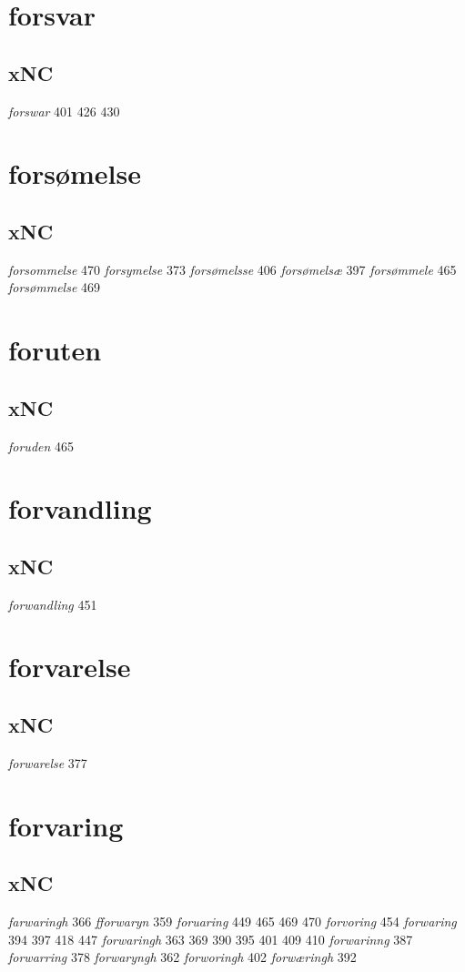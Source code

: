 \documentclass[a4paper,twocolumn]{article}
\begin{document}
\section{forsvar}
\label{sec:org2040b30}
\subsection{xNC}
\label{sec:orge80c26a}
\emph{forswar} 401 426 430 
\section{forsømelse}
\label{sec:org3353c8f}
\subsection{xNC}
\label{sec:org1ab0f16}
\emph{forsommelse} 470 \emph{forsymelse} 373 \emph{forsømelsse} 406 \emph{forsømelsæ} 397 \emph{forsømmele} 465 \emph{forsømmelse} 469 
\section{foruten}
\label{sec:org7389f62}
\subsection{xNC}
\label{sec:org413c5e6}
\emph{foruden} 465 
\section{forvandling}
\label{sec:org83466bd}
\subsection{xNC}
\label{sec:orgb20d7e0}
\emph{forwandling} 451 
\section{forvarelse}
\label{sec:orgc8770be}
\subsection{xNC}
\label{sec:org73b9adc}
\emph{forwarelse} 377 
\section{forvaring}
\label{sec:orgba5bc80}
\subsection{xNC}
\label{sec:org249a69a}
\emph{farwaringh} 366 \emph{fforwaryn} 359 \emph{foruaring} 449 465 469 470 \emph{forvoring} 454 \emph{forwaring} 394 397 418 447 \emph{forwaringh} 363 369 390 395 401 409 410 \emph{forwarinng} 387 \emph{forwarring} 378 \emph{forwaryngh} 362 \emph{forworingh} 402 \emph{forwæringh} 392 
\end{document}
